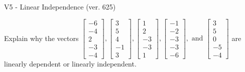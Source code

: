 \begin{exercise}
  \begin{exerciseTitle}V5 - Linear Independence (ver. 625)\end{exerciseTitle}
  \begin{exerciseStatement}
    Explain why the vectors \(\left[\begin{array}{r}
-6 \\
-4 \\
2 \\
-3 \\
-4
\end{array}\right] , \left[\begin{array}{r}
3 \\
5 \\
4 \\
-1 \\
3
\end{array}\right] , \left[\begin{array}{r}
1 \\
2 \\
-3 \\
-3 \\
1
\end{array}\right] , \left[\begin{array}{r}
-1 \\
-2 \\
-3 \\
-3 \\
-6
\end{array}\right] , \text{ and } \left[\begin{array}{r}
3 \\
5 \\
0 \\
-5 \\
-4
\end{array}\right]\) are linearly dependent or linearly independent.	



\end{exerciseStatement}
\end{exercise}
